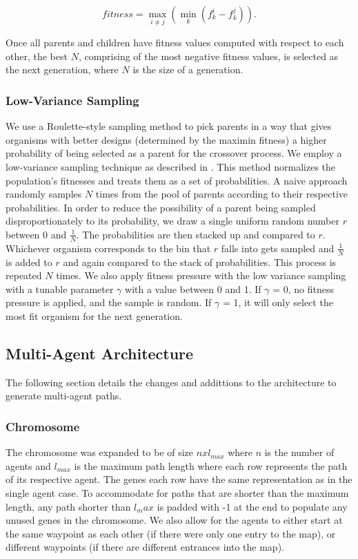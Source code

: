 \documentclass[letterpaper, 10 pt, conference]{ieeeconf}  %
\begin{document}
\begin{equation}%
    fitness = \max_{i \neq j}\left(\min_{k}\left(f_k^i - f_k^j\right)\right).
\end{equation}

Once all parents and children have fitness values computed with respect to each other, the best $N$, comprising of the most negative fitness values, is selected as the next generation, where $N$ is the size of a generation.

\subsubsection{Low-Variance Sampling}

We use a Roulette-style sampling method to pick parents in a way that gives organisms with better designs (determined by the maximin fitness) a higher probability of being selected as a parent for the crossover process. We employ a low-variance sampling technique as described in \cite{Thrun2006}. This method normalizes the population's fitnesses and treats them as a set of probabilities. A naive approach randomly samples $N$ times from the pool of parents according to their respective probabilities. In order to reduce the possibility of a parent being sampled disproportionately to its probability, we draw a single uniform random number $r$ between 0 and $\tfrac{1}{N}$. The probabilities are then stacked up and compared to $r$. Whichever organism corresponds to the bin that $r$ falls into gets sampled and $\tfrac{1}{N}$ is added to $r$ and again compared to the stack of probabilities. This process is repeated $N$ times. We also apply fitness pressure with the low variance sampling with a tunable parameter $\gamma$ with a value between 0 and 1. If $\gamma$ = 0, no fitness pressure is applied, and the sample is random. If $\gamma$ = 1, it will only select the most fit organism for the next generation.

\subsection{Multi-Agent Architecture}

The following section details the changes and addittions to the architecture to generate multi-agent paths.

\subsubsection{Chromosome}
The chromosome was expanded to be of size $nxl_{max}$ where $n$ is the number of agents and $l_{max}$ is the maximum path length where each row represents the path of its respective agent. The genes each row have the same representation as in the single agent case. To accommodate for paths that are shorter than the maximum length, any path shorter than $l_max$ is padded with -1 at the end to populate any unused genes in the chromosome. We also allow for the agents to either start at the same waypoint as each other (if there were only one entry to the map), or different waypoints (if there are different entrances into the map).
\end{document}
